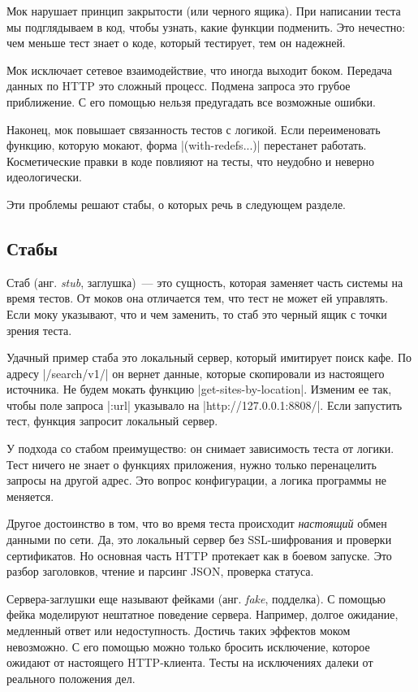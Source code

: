 Мок нарушает принцип закрытости (или черного ящика). При написании теста мы
подглядываем в код, чтобы узнать, какие функции подменить. Это нечестно: чем
меньше тест знает о коде, который тестирует, тем он надежней.

Мок исключает сетевое взаимодействие, что иногда выходит боком. Передача данных
по HTTP это сложный процесс. Подмена запроса это грубое приближение. С его
помощью нельзя предугадать все возможные ошибки.

Наконец, мок повышает связанность тестов с логикой. Если переименовать функцию,
которую мокают, форма \spverb|(with-redefs...)| перестанет
работать. Косметические правки в коде повлияют на тесты, что неудобно и неверно
идеологически.

Эти проблемы решают стабы, о которых речь в следующем разделе.

\subsection{Стабы}

Стаб (анг. \emph{stub}, заглушка)~--- это сущность, которая заменяет часть
системы на время тестов. От моков она отличается тем, что тест не может ей
управлять. Если моку указывают, что и чем заменить, то стаб это черный ящик с
точки зрения теста.

Удачный пример стаба это локальный сервер, который имитирует поиск кафе. По
адресу \spverb|/search/v1/| он вернет данные, которые скопировали из настоящего
источника. Не будем мокать функцию \spverb|get-sites-by-location|. Изменим ее
так, чтобы поле запроса \spverb|:url| указывало на \spverb|http://127.0.0.1:8808/|.
Если запустить тест, функция запросит локальный сервер.

У подхода со стабом преимущество: он снимает зависимость теста от логики. Тест
ничего не знает о функциях приложения, нужно только перенацелить запросы на
другой адрес. Это вопрос конфигурации, а логика программы не меняется.

Другое достоинство в том, что во время теста происходит \emph{настоящий} обмен
данными по сети. Да, это локальный сервер без SSL-шифрования и проверки
сертификатов. Но основная часть HTTP протекает как в боевом запуске. Это разбор
заголовков, чтение и парсинг JSON, проверка статуса.

Сервера-заглушки еще называют фейками (анг. \emph{fake}, подделка). С помощью
фейка моделируют нештатное поведение сервера. Например, долгое ожидание,
медленный ответ или недоступность. Достичь таких эффектов моком невозможно. С
его помощью можно только бросить исключение, которое ожидают от настоящего
HTTP-клиента. Тесты на исключениях далеки от реального положения дел.

